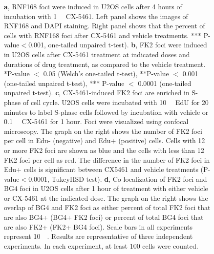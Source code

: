 \begin{figure}
  \caption[]{
        \newline
        \textbf{a}, RNF168 foci were induced in U2OS cells after 4 hours of incubation with \SI{1}{\micro\Molar} CX-5461. Left panel shows the images of RNF168 and DAPI staining. Right panel shows that the percent of cells with RNF168 foci after CX-5461 and vehicle treatments. *** P-value$<$0.001, one-tailed unpaired t-test).  
        \newline
        \textbf{b}, FK2 foci were induced in U2OS cells after CX-5461 treatment at indicated doses and durations of drug treatment, as compared to the vehicle treatment. *P-value $<$ 0.05 (Welch's one-tailed t-test), **P-value $<$ 0.001 (one-tailed unpaired t-test), *** P-value $<$ 0.0001 (one-tailed unpaired t-test).
        \newline
        \textbf{c}, CX-5461-induced FK2 foci are enriched in S-phase of cell cycle. U2OS cells were incubated with \SI{10}{\micro\Molar} EdU for 20 minutes to label S-phase cells followed by incubation with vehicle or \SI{0.1}{\micro\Molar} CX-5461 for 1 hour. Foci were visualized using confocal microscopy. The graph on the right shows the number of FK2 foci per cell in Edu- (negative) and Edu+ (positive) cells. Cells with 12 or more FK2 foci are shown as blue and the cells with less than 12 FK2 foci per cell as red. The difference in the number of FK2 foci in Edu+ cells is significant between CX5461 and vehicle treatments (P-value$<0$.0001, TukeyHSD test).
        \newline
        \textbf{d}, Co-localization of FK2 foci and BG4 foci in U2OS cells after 1 hour of treatment with either vehicle or CX-5461 at the indicated dose. The graph on the right shows the overlap of BG4 and FK2 foci as either percent of total FK2 foci that are also BG4+ (BG4+ FK2 foci) or percent of total BG4 foci that are also FK2+ (FK2+ BG4 foci).   
        \newline
        Scale bars in all experiments represent \SI{10}{\micro\Molar}. Results are representative of three independent experiments. In each experiment, at least 100 cells were counted.
        }
 \end{figure}
 \clearpage

